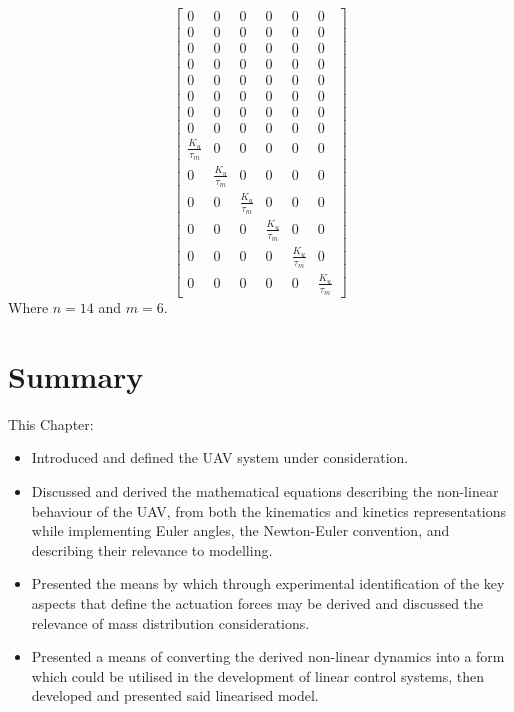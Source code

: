 \documentclass[12pt,a4paper,twoside]{report}
\begin{document}
					\begin{equation}
					\begin{bmatrix}
					0&0&0&0&0&0\\
					0&0&0&0&0&0\\
					0&0&0&0&0&0\\
					0&0&0&0&0&0\\
					0&0&0&0&0&0\\
					0&0&0&0&0&0\\
					0&0&0&0&0&0\\
					0&0&0&0&0&0\\
					\frac{K_u}{\tau_m}&0&0&0&0&0\\
					0&\frac{K_u}{\tau_m}&0&0&0&0\\
					0&0&\frac{K_u}{\tau_m}&0&0&0\\
					0&0&0&\frac{K_u}{\tau_m}&0&0\\
					0&0&0&0&\frac{K_u}{\tau_m}&0\\
					0&0&0&0&0&\frac{K_u}{\tau_m}
					\end{bmatrix}
					\end{equation}
					Where $n = 14$ and $m = 6$.
			
			\section{Summary}
				
				This Chapter:
				\\
				\begin{itemize}
					\item 
				 		Introduced and defined the UAV system under consideration.
				 	\item 
				 		Discussed and derived the mathematical equations describing the non-linear behaviour of the UAV, from both the kinematics and kinetics representations while implementing Euler angles, the Newton-Euler convention, and describing their relevance to modelling. 
				 	\item
				 		Presented the means by which through experimental identification of the key aspects that define the actuation forces may be derived and discussed the relevance of mass distribution considerations.
				 	\item
				 		Presented a means of converting the derived non-linear dynamics into a form which could be utilised in the development of linear control systems, then developed and presented said linearised model.
				\end{itemize}
			 
\end{document}
